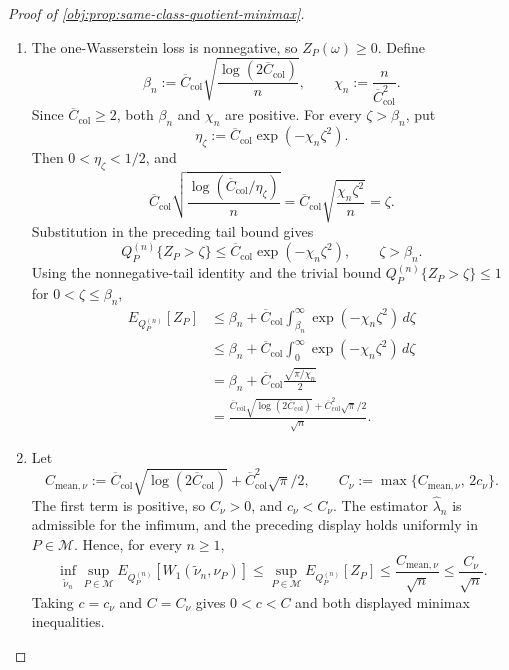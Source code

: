 \documentclass[11pt]{article}
\begin{document}
\begin{proof}[Proof of \cref{obj:prop:same-class-quotient-minimax}]
\begin{enumerate}
\item
The one-Wasserstein loss is nonnegative, so \(Z_P(\omega)\ge0\). Define
\[
  \beta_n:=
  \overline C_{\mathrm{col}}
  \sqrt{\frac{\log(2\overline C_{\mathrm{col}})}{n}},
  \qquad
  \chi_n:=
  \frac{n}{\overline C_{\mathrm{col}}^2}.
\]
Since \(\overline C_{\mathrm{col}}\ge2\), both \(\beta_n\) and \(\chi_n\) are positive. For every \(\zeta>\beta_n\), put
\[
  \eta_\zeta:=
  \overline C_{\mathrm{col}}\exp(-\chi_n\zeta^2).
\]
Then \(0<\eta_\zeta<1/2\), and
\[
  \overline C_{\mathrm{col}}
  \sqrt{\frac{\log(\overline C_{\mathrm{col}}/\eta_\zeta)}{n}}
  =
  \overline C_{\mathrm{col}}
  \sqrt{\frac{\chi_n\zeta^2}{n}}
  =
  \zeta .
\]
Substitution in the preceding tail bound gives
\[
  Q_P^{(n)}\{Z_P>\zeta\}
  \le
  \overline C_{\mathrm{col}}\exp(-\chi_n\zeta^2),
  \qquad \zeta>\beta_n .
\]
Using the nonnegative-tail identity and the trivial bound
\(Q_P^{(n)}\{Z_P>\zeta\}\le1\) for \(0<\zeta\le\beta_n\),
\[
\begin{aligned}
  E_{Q_P^{(n)}}[Z_P]
  &\le
  \beta_n+
  \overline C_{\mathrm{col}}
  \int_{\beta_n}^{\infty}\exp(-\chi_n\zeta^2)\,d\zeta  \\
  &\le
  \beta_n+
  \overline C_{\mathrm{col}}
  \int_{0}^{\infty}\exp(-\chi_n\zeta^2)\,d\zeta  \\
  &=
  \beta_n+
  \overline C_{\mathrm{col}}\frac{\sqrt{\pi/\chi_n}}{2}  \\
  &=
  \frac{
    \overline C_{\mathrm{col}}\sqrt{\log(2\overline C_{\mathrm{col}})}
    +
    \overline C_{\mathrm{col}}^2\sqrt{\pi}/2
  }{\sqrt n}.
\end{aligned}
\]

\item
Let
\[
  C_{\mathrm{mean},\nu}:=
  \overline C_{\mathrm{col}}\sqrt{\log(2\overline C_{\mathrm{col}})}
  +
  \overline C_{\mathrm{col}}^2\sqrt{\pi}/2,
  \qquad
  C_{\nu}:=\max\{C_{\mathrm{mean},\nu},\,2c_{\nu}\}.
\]
The first term is positive, so \(C_{\nu}>0\), and \(c_{\nu}<C_{\nu}\). The estimator \(\widehat\lambda_n\) is admissible for the infimum, and the preceding display holds uniformly in \(P\in\mathcal M\). Hence, for every \(n\ge1\),
\[
  \inf_{\widetilde\nu_n}
  \sup_{P\in\mathcal M}
  E_{Q_P^{(n)}}\!\left[
    W_1\!\left(\widetilde\nu_n,\nu_P\right)
  \right]
  \le
  \sup_{P\in\mathcal M} E_{Q_P^{(n)}}[Z_P]
  \le
  \frac{C_{\mathrm{mean},\nu}}{\sqrt n}
  \le
  \frac{C_{\nu}}{\sqrt n}.
\]
Taking \(c=c_{\nu}\) and \(C=C_{\nu}\) gives \(0<c<C\) and both displayed minimax inequalities.
\end{enumerate}
\end{proof}
\end{document}

